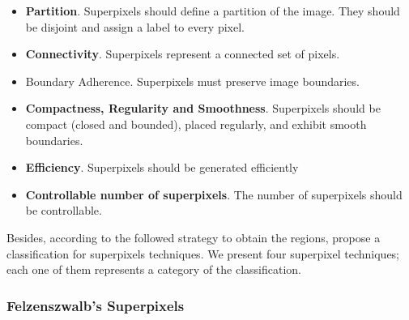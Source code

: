 \begin{itemize}
 \item \textbf{Partition}. Superpixels should define a partition of the image. They should be disjoint and assign a label to every pixel.
 \item \textbf{Connectivity}. Superpixels represent a connected set of pixels.
 \item Boundary Adherence. Superpixels must preserve image boundaries.
 \item \textbf{Compactness, Regularity and Smoothness}. Superpixels should be compact (closed and bounded), placed regularly, and exhibit smooth boundaries.
 \item \textbf{Efficiency}. Superpixels should be generated efficiently

 \item \textbf{Controllable number of superpixels}. The number of superpixels should be controllable.
\end{itemize}

Besides, according to the followed strategy to obtain the regions, \cite{Stutz.Hermans.ea:CVIU:2018} propose a classification for superpixels techniques. We present four superpixel techniques; each one of them represents a category of the classification.




\subsubsection{Felzenszwalb's Superpixels}

